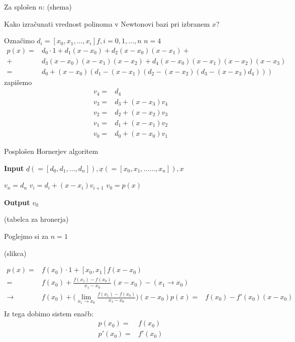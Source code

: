 \documentclass[a4paper,12pt]{article}
\theoremstyle{definition}
\theoremstyle{remark}
\begin{document}
Za splošen $n$:
(shema)

Kako izračunati vrednost polinoma v Newtonovi bazi pri izbranem $x$?

Označimo $d_i = [x_0, x_1, \dots, x_i] f, i = 0, 1, \dots, n$
$n = 4$
\begin{align*}
    p(x) =& d_0 \cdot 1 + d_1 (x-x_0) + d_2 (x-x_0)(x-x_1) + \\
         +& d_3 (x-x_0)(x-x_1)(x-x_2) + d_4 (x-x_0)(x-x_1)(x-x_2)(x-x_3) \\
         =& d_0 + (x-x_0)(d_1 - (x-x_1)(d_2 - (x-x_2)(d_3 - (x-x_3)d_4)))
\end{align*}
zapišemo
\begin{align*}
    v_4 =& d_4 \\
    v_3 =& d_3 + (x-x_3)v_4 \\
    v_2 =& d_2 + (x-x_2)v_3 \\
    v_1 =& d_1 + (x-x_1)v_2 \\
    v_0 =& d_0 + (x-x_0)v_1
\end{align*}



\begin{algorithm}
    \caption{Posplošen Hornerjev algoritem}\label{alg:horner}
    \hspace*{\algorithmicindent} \textbf{Input} $\underline{d} (= [d_0, d_1, \dots, d_n]), \underline{x}(= [x_0, x_1, \dots..., x_n]), x$
    \begin{algorithmic}
        \State $v_n = d_n$
            \State $v_i = d_i + (x-x_i) v_{i+1}$
        \EndFor
        \State $v_0 = p(x)$
    \end{algorithmic}
    \hspace*{\algorithmicindent} \textbf{Output} $v_0$
\end{algorithm}

(tabelca za hronerja)

Poglejmo si za $n = 1$

(slikca)

\begin{align*}
    p(x) =& f(x_0)\cdot 1 + [x_0, x_1] f (x-x_0) \\
         =& f(x_0) + \frac{f(x_1) - f(x_0)}{x_1 - x_0}(x-x_0) - (x_1 \to x_0) \\
         \longrightarrow& f(x_0) + \biggl(\lim_{x_1 \to x_0} \frac{f(x_1)-f(x_0)}{x_1-x_0}\biggr)(x-x_0)
    p(x) =& f(x_0) - f'(x_0)(x-x_0) \\
\end{align*}
Iz tega dobimo sistem enačb:
\begin{align*}
    p(x_0) =& f(x_0) \\
    p'(x_0) =& f'(x_0)
\end{align*}
\end{document}
